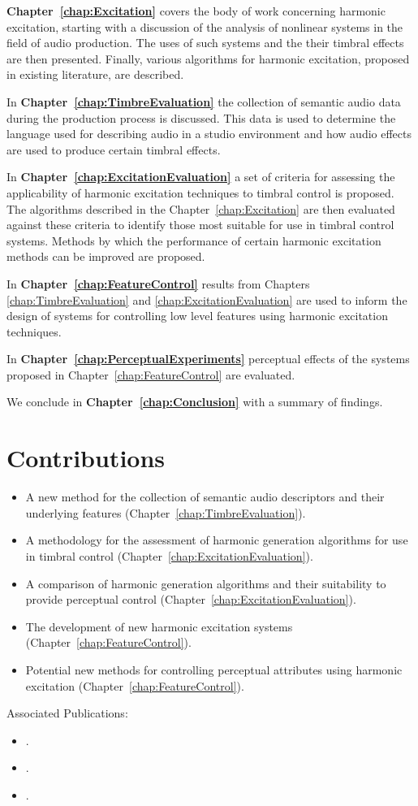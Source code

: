	{\bf{Chapter~\ref{chap:Excitation}}} covers the body of work concerning harmonic excitation, starting with a
	discussion of the analysis of nonlinear systems in the field of audio production. The uses of such systems and the
	their timbral effects are then presented. Finally, various algorithms for harmonic excitation, proposed in existing
	literature, are described.

	In {\bf{Chapter~\ref{chap:TimbreEvaluation}}} the collection of semantic audio data during the production process is
	discussed. This data is used to determine the language used for describing audio in a studio environment and how
	audio effects are used to produce certain timbral effects.

	In {\bf{Chapter~\ref{chap:ExcitationEvaluation}}} a set of criteria for assessing the applicability of harmonic
	excitation techniques to timbral control is proposed. The algorithms described in the Chapter~\ref{chap:Excitation}
	are then evaluated against these criteria to identify those most suitable for use in timbral control systems.
	Methods by which the performance of certain harmonic excitation methods can be improved are proposed.

	In {\bf{Chapter~\ref{chap:FeatureControl}}} results from Chapters \ref{chap:TimbreEvaluation} and
	\ref{chap:ExcitationEvaluation} are used to inform the design of systems for controlling low level features using
	harmonic excitation techniques.

	In {\bf{Chapter~\ref{chap:PerceptualExperiments}}} perceptual effects of the systems proposed in
	Chapter~\ref{chap:FeatureControl} are evaluated. 

	\note
	{
		We conclude in {\bf{Chapter~\ref{chap:Conclusion}}} with a summary of findings.
	}

\section{Contributions}
\label{sec:Introduction-Contributions}

	\begin{itemize}
		\item A new method for the collection of semantic audio descriptors and their underlying features
		      (Chapter~\ref{chap:TimbreEvaluation}).
		\item A methodology for the assessment of harmonic generation algorithms for use in timbral control
		      (Chapter~\ref{chap:ExcitationEvaluation}).
		\item A comparison of harmonic generation algorithms and their suitability to provide perceptual control
		      (Chapter~\ref{chap:ExcitationEvaluation}).
		\item The development of new harmonic excitation systems (Chapter~\ref{chap:FeatureControl}).
		\item Potential new methods for controlling perceptual attributes using harmonic excitation
		      (Chapter~\ref{chap:FeatureControl}).
	\end{itemize}

	Associated Publications:

	\begin{itemize}
		\item {}.
		\item {}.
		\item {}.
	\end{itemize}
